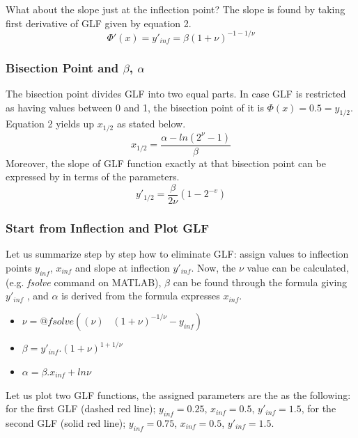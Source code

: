 \documentclass[twocolumn]{article}
\begin{document}
What about the slope just at the inflection point? The slope is found by taking first derivative of GLF given by equation 2. 
\begin{equation*}
\Phi'(x)=y'_{inf}=\beta(1+\nu)^{-1-1/\nu}   
\end{equation*}

\subsubsection{Bisection Point and $\beta$, $\alpha$}
The bisection point divides GLF into two equal parts. In case GLF is restricted as having values between 0 and 1, the bisection point of it is $\Phi(x)=0.5=y_{1/2}$. Equation 2 yields up $x_{1/2}$ as stated below.
\begin{equation*}
 x_{1/2}=\dfrac{\alpha-ln(2^{\nu}-1)}{\beta}
\end{equation*}
Moreover, the slope of GLF function exactly at that bisection point can be expressed by in terms of the parameters. 
\begin{equation*}
 y'_{1/2}=\dfrac{\beta}{2\nu}(1-2^{-v})
\end{equation*}

\subsubsection{Start from Inflection and Plot GLF}
Let us summarize step by step how to eliminate GLF: assign values to inflection points $y_{inf}$, $x_{inf}$ and slope at inflection $y'_{inf}$. Now, the $\nu$ value can be calculated, (e.g. \textit{fsolve} command on MATLAB), $\beta$ can be found through the formula giving $y'_{inf}$ , and $\alpha$ is derived from the formula expresses $x_{inf}$.

\begin{itemize}
\item $\nu=@fsolve((\nu) \;\;\; (1+\nu)^{-1/\nu}-y_{inf})$
\item $\beta=y'_{inf}.(1+\nu)^{1+1/\nu}$
\item $\alpha=\beta.x_{inf}+ln\nu$
\end{itemize}

Let us plot two GLF functions, the assigned parameters are the as the following: for the first GLF (dashed red line); $y_{inf}=0.25$, $x_{inf}=0.5$, $y'_{inf}=1.5$, for the second GLF (solid red line); $y_{inf}=0.75$, $x_{inf}=0.5$, $y'_{inf}=1.5$.  
\end{document}
